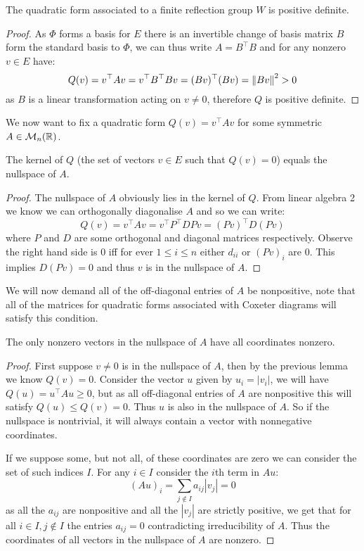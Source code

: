 \documentclass[../main.tex]{subfiles}
\begin{document}
\begin{proposition}
    The quadratic form associated to a finite reflection group $W$ is positive definite.
    \begin{proof}
        As $\Phi$ forms a basis for $E$ there is an invertible change of basis matrix $B$ form the standard basis to $\Phi$, we can thus write $A=B^\top B$ and for any nonzero $v\in E$ have:\[
        Q(v) = v^\top A v = v^\top B^\top B v = (B v)^\top (B v) = \left\lVert B v \right\rVert^2 > 0
        \] as $B$ is a linear transformation acting on $v\neq 0$, therefore $Q$ is positive definite.
    \end{proof}
\end{proposition}

We now want to fix a quadratic form $Q(v) = v^\top A v$ for some symmetric $A\in\mathcal{M}_n(\mathbb{R})$.

\begin{lemma}
    The kernel of $Q$ (the set of vectors $v\in E$ such that $Q(v)=0$) equals the nullspace of $A$.
    \begin{proof}
        The nullspace of $A$ obviously lies in the kernel of $Q$. From linear algebra 2 we know we can orthogonally diagonalise $A$ and so we can write: \[
            Q(v) = v^\top A v = v^\top P^\top D P v = (P v)^\top D (P v)
        \] where $P$ and $D$ are some orthogonal and diagonal matrices respectively. Observe the right hand side is $0$ iff for ever $1\leq i \leq n$ either $d_{ii}$ or $(P v)_i$ are $0$. This implies $D (P v)=0$ and thus $v$ is in the nullspace of $A$.
    \end{proof}
\end{lemma}

We will now demand all of the off-diagonal entries of $A$ be nonpositive, note that all of the matrices for quadratic forms associated with Coxeter diagrams will satisfy this condition.

\begin{lemma}
    The only nonzero vectors in the nullspace of $A$ have all coordinates nonzero.
    \begin{proof}
        First suppose $v\neq 0$ is in the nullspace of $A$, then by the previous lemma we know $Q(v)=0$. Consider the vector $u$ given by $u_i = |v_i|$, we will have $Q(u) = u^\top A u \geq 0$, but as all off-diagonal entries of $A$ are nonpositive this will satisfy $Q(u)\leq Q(v) = 0$. Thus $u$ is also in the nullspace of $A$. So if the nullspace is nontrivial, it will always contain a vector with nonnegative coordinates. 

        If we suppose some, but not all, of these coordinates are zero we can consider the set of such indices $I$. For any $i\in I$ consider the $i$th term in $Au$:\[
            (Au)_i = \sum_{j\notin I}a_{ij} |v_j| = 0
        \] as all the $a_{ij}$ are nonpositive and all the $|v_j|$ are strictly positive, we get that for all $i\in I, j\notin I$ the entries $a_{ij}=0$ contradicting irreducibility of $A$. Thus the coordinates of all vectors in the nullspace of $A$ are nonzero.
    \end{proof}
\end{lemma}
\end{document}
